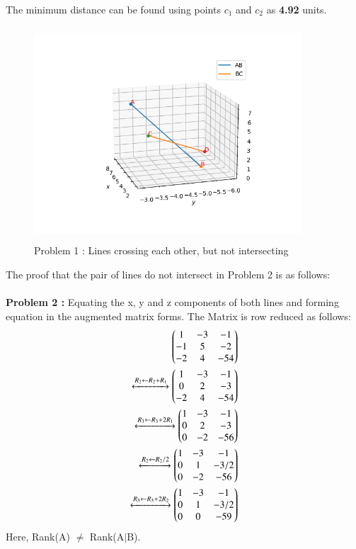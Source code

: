 \documentclass[journal,12pt,twocolumn]{IEEEtran}
\begin{document}
\\
The minimum distance can be found using points $c_1$ and $c_2$ as \textbf{4.92} units.
\begin{figure}[ht]
\centering
\includegraphics[width=10cm, height=8cm]{Figure_1}
\caption{Problem 1 : Lines crossing each other, but not intersecting}
\label{Fig2}
\end{figure}
\newpage
The proof that the pair of lines do not intersect in Problem 2 is as follows:\\
\\
\textbf{Problem 2 :} Equating the x, y and z components of both lines and forming equation in the augmented matrix forms. The Matrix is row reduced as follows:\\
\begin{align}
\begin{pmatrix}1 & -3 & -1\\-1 & 5 & -2\\-2 &4&-54\end{pmatrix}\\
\xleftrightarrow[]{R_2\leftarrow R_2+R_1}
\begin{pmatrix}1 & -3 & -1 \\0 & 2 & -3\\-2 &4&-54\end{pmatrix}\\
\xleftrightarrow[]{R_3\leftarrow R_3+2R_1}   
\begin{pmatrix}1 & -3 & -1 \\0 & 2 & -3\\0 &-2&-56\end{pmatrix}\\
\xleftrightarrow[]{R_2\leftarrow R_2/2}
\begin{pmatrix}1 & -3 & -1 \\0 & 1 & -3/2\\0 &-2&-56\end{pmatrix}\\
\xleftrightarrow[]{R_3\leftarrow R_3+2R_2}
\begin{pmatrix}1 & -3 & -1 \\0 & 1 & -3/2\\0 &0&-59\end{pmatrix}
\end{align} 
Here, Rank(A) $\neq$ Rank(A$\mid$B).
\end{document}
